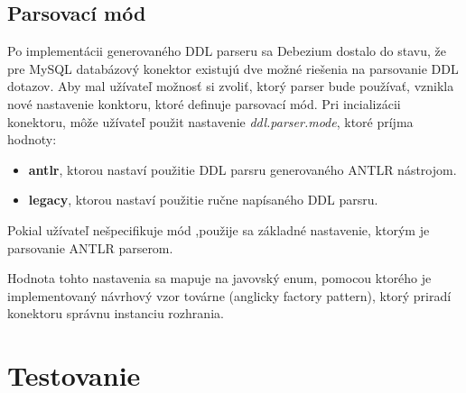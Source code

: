 \subsection{Parsovací mód}
Po implementácii generovaného DDL parseru sa Debezium dostalo do stavu, že pre MySQL databázový konektor existujú dve možné riešenia na parsovanie DDL dotazov. Aby mal užívateľ možnosť si zvoliť, ktorý parser bude používať, vznikla nové nastavenie konktoru, ktoré definuje parsovací mód. Pri incializácii konektoru, môže užívateľ použit nastavenie \textit{ddl.parser.mode}, ktoré príjma hodnoty:

\begin{itemize}
\item \textbf{antlr}, ktorou nastaví použitie DDL parsru generovaného ANTLR nástrojom.
\item \textbf{legacy}, ktorou nastaví použitie ručne napísaného DDL parsru.
\end{itemize}

Pokial užívateľ nešpecifikuje mód ,použije sa základné nastavenie, ktorým je parsovanie ANTLR parserom.

Hodnota tohto nastavenia sa mapuje na javovský enum, pomocou ktorého je implementovaný návrhový vzor továrne (anglicky factory pattern), ktorý priradí konektoru správnu instanciu  rozhrania.

\section{Testovanie}
